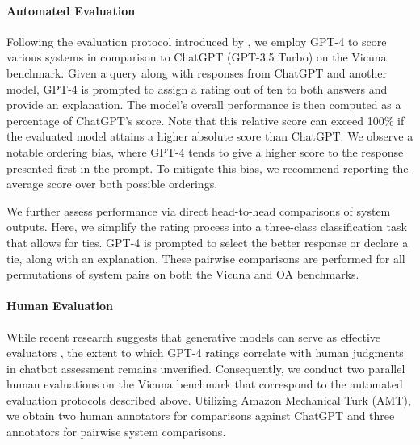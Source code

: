 \paragraph{Automated Evaluation} Following the evaluation protocol introduced by \citet{vicuna2023}, we employ GPT-4 to score various systems in comparison to ChatGPT (GPT-3.5 Turbo) on the Vicuna benchmark. Given a query along with responses from ChatGPT and another model, GPT-4 is prompted to assign a rating out of ten to both answers and provide an explanation. The model’s overall performance is then computed as a percentage of ChatGPT’s score. Note that this relative score can exceed 100\% if the evaluated model attains a higher absolute score than ChatGPT. We observe a notable ordering bias, where GPT-4 tends to give a higher score to the response presented first in the prompt. To mitigate this bias, we recommend reporting the average score over both possible orderings.

We further assess performance via direct head-to-head comparisons of system outputs. Here, we simplify the rating process into a three-class classification task that allows for ties. GPT-4 is prompted to select the better response or declare a tie, along with an explanation. These pairwise comparisons are performed for all permutations of system pairs on both the Vicuna and OA benchmarks.

\paragraph{Human Evaluation} While recent research suggests that generative models can serve as effective evaluators \citep{fu2023gptscore}, the extent to which GPT-4 ratings correlate with human judgments in chatbot assessment remains unverified. Consequently, we conduct two parallel human evaluations on the Vicuna benchmark that correspond to the automated evaluation protocols described above. Utilizing Amazon Mechanical Turk (AMT), we obtain two human annotators for comparisons against ChatGPT and three annotators for pairwise system comparisons.

